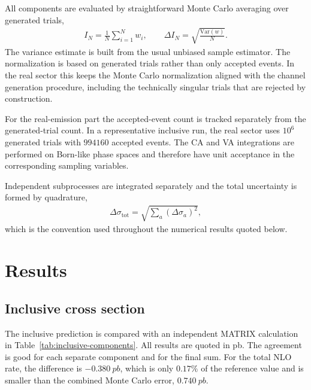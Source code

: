 \documentclass[11pt]{article}
\begin{document}
All components are evaluated by straightforward Monte Carlo averaging over generated trials,
\begin{align}
I_N = \frac{1}{N}\sum_{i=1}^N w_i,
\qquad
\Delta I_N = \sqrt{\frac{\mathrm{Var}(w)}{N}}.
\end{align}
The variance estimate is built from the usual unbiased sample estimator. The normalization is based on generated trials rather than only accepted events. In the real sector this keeps the Monte Carlo normalization aligned with the channel generation procedure, including the technically singular trials that are rejected by construction.

For the real-emission part the accepted-event count is tracked separately from the generated-trial count.
In a representative inclusive run, the real sector uses $10^6$ generated trials with $994160$ accepted events. The CA and VA integrations are performed on Born-like phase spaces and therefore have unit acceptance in the corresponding sampling variables.

Independent subprocesses are integrated separately and the total uncertainty is formed by quadrature,
\begin{align}
\Delta\sigma_{\text{tot}} = \sqrt{\sum_a (\Delta\sigma_a)^2},
\end{align}
which is the convention used throughout the numerical results quoted below.

\section{Results}

\subsection{Inclusive cross section}

The inclusive prediction is compared with an independent MATRIX calculation~\cite{MATRIX} in Table~\ref{tab:inclusive-components}. All results are quoted in pb. The agreement is good for each separate component and for the final sum. For the total NLO rate, the difference is $-\SI{0.380}{pb}$, which is only $0.17\%$ of the reference value and is smaller than the combined Monte Carlo error, $\SI{0.740}{pb}$.
\end{document}
